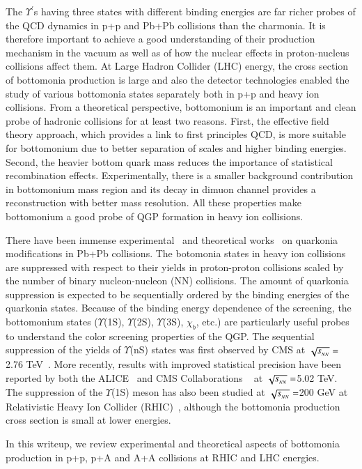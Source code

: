 The $\Upsilon^{'}$s having three states with different binding
energies are far richer probes of the QCD dynamics in p+p and Pb+Pb collisions than
the charmonia.
It is therefore important to achieve a good understanding of their
production mechanism in the vacuum as well as of how the nuclear effects in proton-nucleus
collisions affect them.
  At Large Hadron Collider (LHC) energy, the cross section of bottomonia production is large and
also the detector technologies enabled the study of various bottomonia 
states separately both in p+p and heavy ion collisions.
From a theoretical perspective, bottomonium is an important and clean probe 
of hadronic collisions for at least two reasons. 
First, the effective field theory approach, which provides a link to first 
principles QCD, is more suitable for bottomonium due to better separation of 
scales and higher binding energies. Second, the heavier bottom quark 
mass reduces the importance of statistical recombination effects.
Experimentally, there is a smaller background contribution in bottomonium
mass region and its decay in dimuon channel provides a reconstruction with better
mass resolution. 
 All these properties make bottomonium a good probe of 
QGP formation in heavy ion collisions.


There have been immense
experimental~\cite{Sirunyan:2017isk,Sirunyan:2017lzi,Sirunyan:2018nsz,Acharya:2019iur,Acharya:2018mni}
and theoretical works~\cite{Strickland:2011mw,Song:2011nu,Kumar:2014kfa,Kumar:2019xdj} on
quarkonia modifications in Pb+Pb collisions.
The botomonia states in heavy ion collisions are suppressed with respect to their yields
in proton-proton collisions scaled by the number of binary nucleon-nucleon
(NN) collisions.
The amount of quarkonia suppression is expected to be sequentially ordered by the binding
energies of the quarkonia states.
 Because of the binding energy
dependence of the screening, the bottomonium states ($\Upsilon$(1S), $\Upsilon$(2S),
$\Upsilon$(3S), $\chi_{b}$, etc.) are particularly useful probes to understand the color screening
properties of the QGP.
The sequential suppression of the yields of $\Upsilon$(nS) states was first observed by
CMS at $\sqrt{s_{_{NN}}} =$2.76 TeV~\cite{Chatrchyan:2011pe,Chatrchyan:2012lxa}. More recently, results with improved
statistical precision have been reported by both the ALICE~\cite{ALICE:2018wzm}
and CMS Collaborations ~\cite{Sirunyan:2017lzi,Sirunyan:2018nsz} at $\sqrt{s_{_{NN}}} =$5.02 TeV.
The suppression of the $\Upsilon$(1S)
meson has also been studied at $\sqrt{s_{_{NN}}} =$200 GeV at Relativistic Heavy Ion Collider (RHIC)~\cite{STAR:2013kwk}, although the
bottomonia production cross section is small at lower energies. 

In this writeup, we review experimental and theoretical aspects of bottomonia production in p+p, p+A
and A+A collisions at RHIC and LHC energies.







